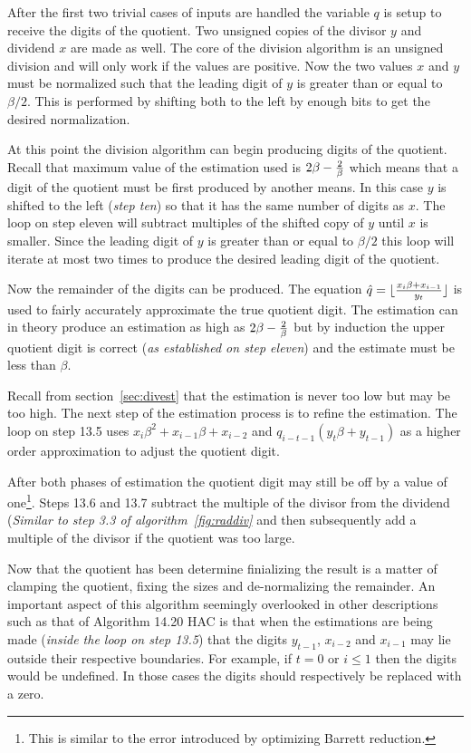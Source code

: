 \documentclass[b5paper]{book}
\begin{document}
After the first two trivial cases of inputs are handled the variable $q$ is setup to receive the digits of the quotient.  Two unsigned copies of the
divisor $y$ and dividend $x$ are made as well.  The core of the division algorithm is an unsigned division and will only work if the values are
positive.  Now the two values $x$ and $y$ must be normalized such that the leading digit of $y$ is greater than or equal to $\beta / 2$.  
This is performed by shifting both to the left by enough bits to get the desired normalization.  

At this point the division algorithm can begin producing digits of the quotient.  Recall that maximum value of the estimation used is 
$2\beta - {2 \over \beta}$ which means that a digit of the quotient must be first produced by another means.  In this case $y$ is shifted
to the left (\textit{step ten}) so that it has the same number of digits as $x$.  The loop on step eleven will subtract multiples of the 
shifted copy of $y$ until $x$ is smaller.  Since the leading digit of $y$ is greater than or equal to $\beta/2$ this loop will iterate at most two
times to produce the desired leading digit of the quotient.  

Now the remainder of the digits can be produced.  The equation $\hat q = \lfloor {{x_i \beta + x_{i-1}}\over y_t} \rfloor$ is used to fairly
accurately approximate the true quotient digit.  The estimation can in theory produce an estimation as high as $2\beta - {2 \over \beta}$ but by
induction the upper quotient digit is correct (\textit{as established on step eleven}) and the estimate must be less than $\beta$.  

Recall from section~\ref{sec:divest} that the estimation is never too low but may be too high.  The next step of the estimation process is
to refine the estimation.  The loop on step 13.5 uses $x_i\beta^2 + x_{i-1}\beta + x_{i-2}$ and $q_{i - t - 1}(y_t\beta + y_{t-1})$ as a higher
order approximation to adjust the quotient digit.

After both phases of estimation the quotient digit may still be off by a value of one\footnote{This is similar to the error introduced
by optimizing Barrett reduction.}.  Steps 13.6 and 13.7 subtract the multiple of the divisor from the dividend (\textit{Similar to step 3.3 of
algorithm~\ref{fig:raddiv}} and then subsequently add a multiple of the divisor if the quotient was too large.  

Now that the quotient has been determine finializing the result is a matter of clamping the quotient, fixing the sizes and de-normalizing the 
remainder.  An important aspect of this algorithm seemingly overlooked in other descriptions such as that of Algorithm 14.20 HAC \cite[pp. 598]{HAC}
is that when the estimations are being made (\textit{inside the loop on step 13.5}) that the digits $y_{t-1}$, $x_{i-2}$ and $x_{i-1}$ may lie 
outside their respective boundaries.  For example, if $t = 0$ or $i \le 1$ then the digits would be undefined.  In those cases the digits should
respectively be replaced with a zero.  
\end{document}
